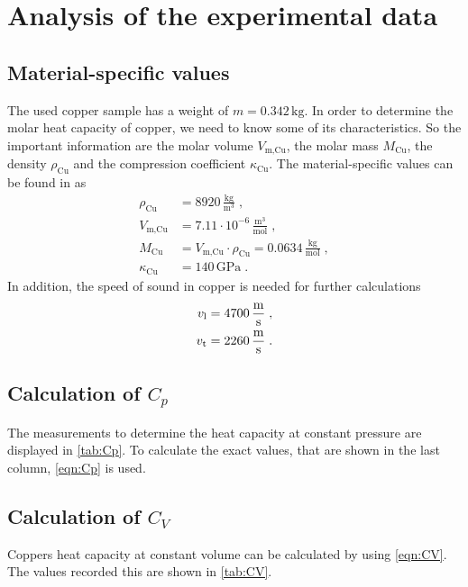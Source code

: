 \section{Analysis of the experimental data}
\label{sec:Auswertung}

%

\subsection{Material-specific values}

The used copper sample has a weight of $m= 0.342 \, \unit{\kilo \gram}$.
In order to determine the molar heat capacity of copper, we need to know some of its characteristics.
So the important information are the molar volume $V_{\text{m,Cu}}$, the molar mass $M_{\text{Cu}}$, the density $\rho_{\text{Cu}}$ and 
the compression coefficient $\kappa_{\text{Cu}}$. 
The material-specific values can be found in \cite{6} as
\begin{align*}
    \rho_{\text{Cu}}&= 8920\,  \frac{\unit{\kilo \gram}}{\unit{\meter}^3} \; , \\
    V_{\text{m,Cu}}&=7.11 \cdot 10^{-6}\, \frac{\unit{\meter}^3}{\text{mol}} \; ,\\
    M_{\text{Cu}}&= V_{\text{m,Cu}} \cdot \rho_{\text{Cu}}= 0.0634\, \frac{\unit{\kilo \gram}}{\text{mol}}\; ,\\
    \kappa_{\text{Cu}}&= 140\, \unit{\giga \pascal}\; .
\end{align*}
In addition, the speed of sound in copper \cite{ap47} is needed for further calculations
\begin{align*}
    v_{\text{l}}&=4700\, \unit{\frac{\meter}{\second}}\; ,\\
v_{\text{t}}&=2260\, \unit{\frac{\meter}{\second}} \; .
\end{align*}

\subsection{Calculation of $C_{p}$}
The measurements to determine the heat capacity at constant pressure are displayed in \autoref{tab:Cp}.
To calculate the exact values, that are shown in the last column, \autoref{eqn:Cp} is used. 


\subsection{Calculation of $C_{V}$}
Coppers heat capacity at constant volume can be calculated by using \autoref{eqn:CV}. The values recorded this are shown in \autoref{tab:CV}.


